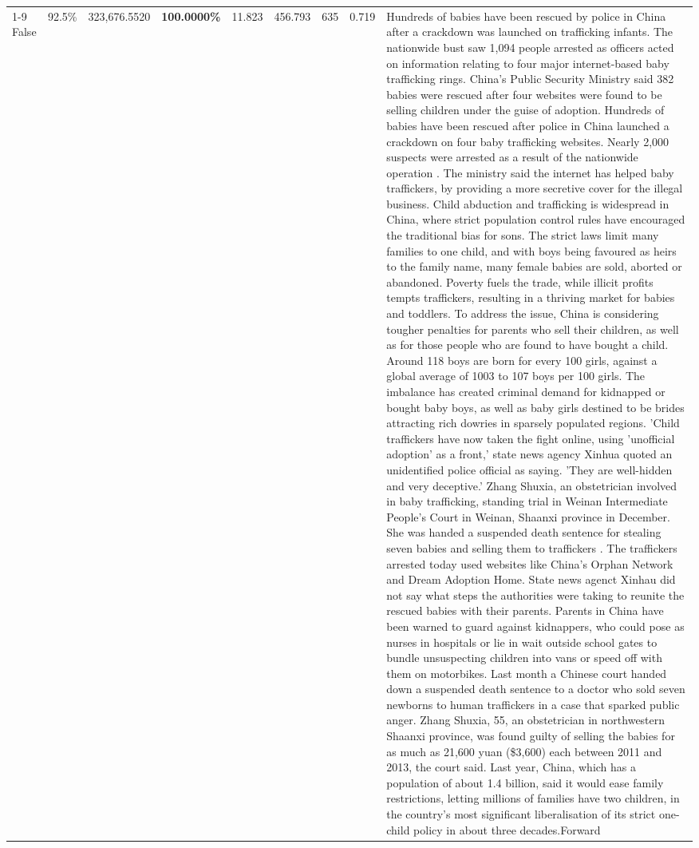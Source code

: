 \begin{table}[H]
\begin{tabular}{lllrlllll}
\cline{1-9}
False & 92.5\% & 323,676.5520 & \bfseries \color{red} 100.0000\% & 11.823 & 456.793 & 635 & 0.719 & Hundreds of babies have been rescued by police in China after a crackdown was launched on trafficking infants. The nationwide bust saw 1,094 people arrested as officers acted on information relating to four major internet-based baby trafficking rings. China's Public Security Ministry said 382 babies were rescued after four websites were found to be selling children under the guise of adoption. Hundreds of babies have been rescued after police in China launched a crackdown on four baby trafficking websites. Nearly 2,000 suspects were arrested as a result of the nationwide operation . The ministry said the internet has helped baby traffickers, by providing a more secretive cover for the illegal business. Child abduction and trafficking is widespread in China, where strict population control rules have encouraged the traditional bias for sons. The strict laws limit many families to one child, and with boys being favoured as heirs to the family name, many female babies are sold, aborted or abandoned. Poverty fuels the trade, while illicit profits tempts traffickers, resulting in a thriving market for babies and toddlers. To address the issue, China is considering tougher penalties for parents who sell their children, as well as for those people who are found to have bought a child. Around 118 boys are born for every 100 girls, against a global average of 1003 to 107 boys per 100 girls. The imbalance has created criminal demand for kidnapped or bought baby boys, as well as baby girls destined to be brides attracting rich dowries in sparsely populated regions. 'Child traffickers have now taken the fight online, using 'unofficial adoption' as a front,' state news agency Xinhua quoted an unidentified police official as saying. 'They are well-hidden and very deceptive.' Zhang Shuxia, an obstetrician involved in baby trafficking, standing trial in Weinan Intermediate People's Court in Weinan, Shaanxi province in December. She was handed a suspended death sentence for stealing seven babies and selling them to traffickers . The traffickers arrested today used websites like China's Orphan Network and Dream Adoption Home. State news agenct Xinhau did not say what steps the authorities were taking to reunite the rescued babies with their parents. Parents in China have been warned to guard against kidnappers, who could pose as nurses in hospitals or lie in wait outside school gates to bundle unsuspecting children into vans or speed off with them on motorbikes. Last month a Chinese court handed down a suspended death sentence to a doctor who sold seven newborns to human traffickers in a case that sparked public anger. Zhang Shuxia, 55, an obstetrician in northwestern Shaanxi province, was found guilty of selling the babies for as much as 21,600 yuan (\$3,600) each between 2011 and 2013, the court said. Last year, China, which has a population of about 1.4 billion, said it would ease family restrictions, letting millions of families have two children, in the country's most significant liberalisation of its strict one-child policy in about three decades.Forward \\

\end{tabular}
\end{table}
